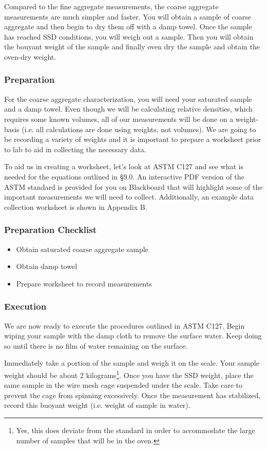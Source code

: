\documentclass[12pt]{article}
\begin{document}
Compared to the fine aggregate measurements, the coarse aggregate measurements are much simpler and faster. You will obtain a sample of coarse aggregate and then begin to dry them off with a damp towel. Once the sample has reached SSD conditions, you will weigh out a sample. Then you will obtain the bouyant weight of the sample and finally oven dry the sample and obtain the oven-dry weight.

\subsubsection{Preparation}
For the coarse aggregate characterization, you will need your saturated sample and a damp towel. Even though we will be calculating relative densities, which requires some known volumes, all of our measurements will be done on a weight-basis (i.e. all calculations are done using weights, not volumes). We are going to be recording a variety of weights and it is important to prepare a worksheet prior to lab to aid in collecting the necessary data.

To aid us in creating a worksheet, let's look at ASTM C127 and see what is needed for the equations outlined in \S 9.0. An interactive PDF version of the ASTM standard is provided for you on Blackboard that will highlight some of the important measurements we will need to collect. Additionally, an example data collection worksheet is shown in Appendix B.

\subsubsection*{Preparation Checklist}
\begin{itemize}
    \item Obtain saturated coarse aggregate sample
    \item Obtain damp towel
    \item Prepare worksheet to record measurements
\end{itemize}

\subsubsection{Execution}
We are now ready to execute the procedures outlined in ASTM C127. Begin wiping your sample with the damp cloth to remove the surface water. Keep doing so until there is no film of water remaining on the surface.

Immediately take a portion of the sample and weigh it on the scale. Your sample weight should be about 2 kilograms\footnote{Yes, this does deviate from the standard in order to accommodate the large number of samples that will be in the oven.}. Once you have the SSD weight, place the same sample in the wire mesh cage suspended under the scale. Take care to prevent the cage from spinning excessively. Once the measurement has stabilized, record this buoyant weight (i.e. weight of sample in water).
\end{document}
